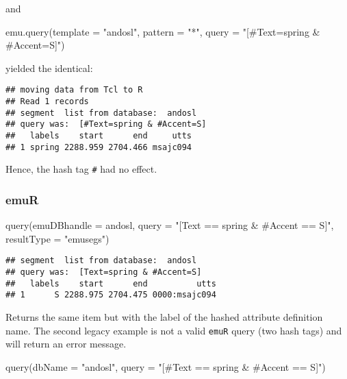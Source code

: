 \documentclass[
]{book}
\newenvironment{Shaded}{\begin{snugshade}}{\end{snugshade}}
\newcommand{\AttributeTok}[1]{\textcolor[rgb]{0.77,0.63,0.00}{#1}}
\newcommand{\FunctionTok}[1]{\textcolor[rgb]{0.00,0.00,0.00}{#1}}
\newcommand{\NormalTok}[1]{#1}
\newcommand{\StringTok}[1]{\textcolor[rgb]{0.31,0.60,0.02}{#1}}
\begin{document}
and

\begin{Shaded}
\begin{Highlighting}[]
\FunctionTok{emu.query}\NormalTok{(}\AttributeTok{template =} \StringTok{"andosl"}\NormalTok{,}
          \AttributeTok{pattern =} \StringTok{"*"}\NormalTok{,}
          \AttributeTok{query =} \StringTok{"[\#Text=spring \& \#Accent=S]"}\NormalTok{)}
\end{Highlighting}
\end{Shaded}

yielded the identical:

\begin{verbatim}
## moving data from Tcl to R
## Read 1 records
## segment  list from database:  andosl
## query was:  [#Text=spring & #Accent=S]
##   labels    start      end     utts
## 1 spring 2288.959 2704.466 msajc094
\end{verbatim}

Hence, the hash tag \texttt{\#} had no effect.

\hypertarget{emur}{%
\subsubsection{emuR}\label{emur}}

\begin{Shaded}
\begin{Highlighting}[]
\FunctionTok{query}\NormalTok{(}\AttributeTok{emuDBhandle =}\NormalTok{ andosl,}
      \AttributeTok{query =} \StringTok{"[Text == spring \& \#Accent == S]"}\NormalTok{,}
      \AttributeTok{resultType =} \StringTok{"emusegs"}\NormalTok{)}
\end{Highlighting}
\end{Shaded}

\begin{verbatim}
## segment  list from database:  andosl
## query was:  [Text=spring & #Accent=S]
##   labels    start      end          utts
## 1      S 2288.975 2704.475 0000:msajc094
\end{verbatim}

Returns the same item but with the label of the hashed
attribute definition name. The second legacy example is not a valid
\texttt{emuR} query (two hash tags) and will return an error message.

\begin{Shaded}
\begin{Highlighting}[]
\FunctionTok{query}\NormalTok{(}\AttributeTok{dbName =} \StringTok{"andosl"}\NormalTok{,}
      \AttributeTok{query =} \StringTok{"[\#Text == spring \& \#Accent == S]"}\NormalTok{)}
\end{Highlighting}
\end{Shaded}
\end{document}
